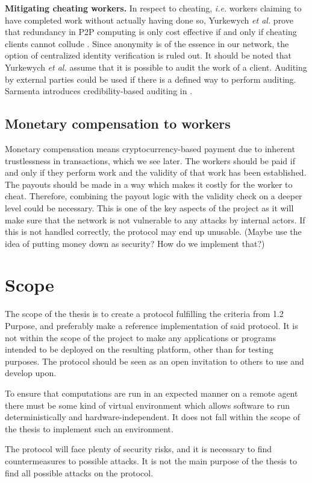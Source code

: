 \textbf{Mitigating cheating workers.}
In respect to cheating, \textit{i.e.} workers claiming to have completed work without actually having done so, Yurkewych \textit{et al.} prove that redundancy in P2P computing is only cost effective if and only if cheating clients cannot collude \cite{yurkewych:2005}. Since anonymity is of the essence in our network, the option of centralized identity verification is ruled out. It should be noted that Yurkewych \textit{et al.} assume that it is possible to audit the work of a client. Auditing by external parties could be used if there is a defined way to perform auditing. Sarmenta introduces credibility-based auditing in \cite{sarmenta:2002}.

\subsection{Monetary compensation to workers}
Monetary compensation means cryptocurrency-based payment due to inherent trustlessness in transactions, which we see later. The workers should be paid if and only if they perform work and the validity of that work has been established. The payouts should be made in a way which makes it costly for the worker to cheat. Therefore, combining the payout logic with the validity check on a deeper level could be necessary. This is one of the key aspects of the project as it will make sure that the network is not vulnerable to any attacks by internal actors. If this is not handled correctly, the protocol may end up unusable. (Maybe use the idea of putting money down as security? How do we implement that?) 

\section{Scope}
The scope of the thesis is to create a protocol fulfilling the criteria from 1.2 Purpose, and preferably make a reference implementation of said protocol. It is not within the scope of the project to make any applications or programs intended to be deployed on the resulting platform, other than for testing purposes. The protocol should be seen as an open invitation to others to use and develop upon.

To ensure that computations are run in an expected manner on a remote agent there must be some kind of virtual environment which allows software to run deterministically and hardware-independent. It does not fall within the scope of the thesis to implement such an environment.

The protocol will face plenty of security risks, and it is necessary to find countermeasures to possible attacks. It is not the main purpose of the thesis to find all possible attacks on the protocol.